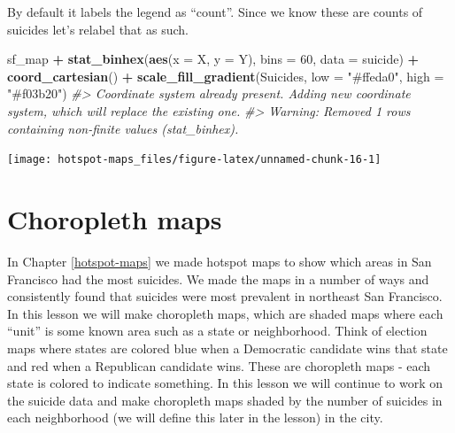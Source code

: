 \documentclass[
  12pt,
]{book}
\newenvironment{Shaded}{\begin{snugshade}}{\end{snugshade}}
\newcommand{\CommentTok}[1]{\textcolor[rgb]{0.56,0.35,0.01}{\textit{#1}}}
\newcommand{\DataTypeTok}[1]{\textcolor[rgb]{0.13,0.29,0.53}{#1}}
\newcommand{\DecValTok}[1]{\textcolor[rgb]{0.00,0.00,0.81}{#1}}
\newcommand{\KeywordTok}[1]{\textcolor[rgb]{0.13,0.29,0.53}{\textbf{#1}}}
\newcommand{\NormalTok}[1]{#1}
\newcommand{\OperatorTok}[1]{\textcolor[rgb]{0.81,0.36,0.00}{\textbf{#1}}}
\newcommand{\StringTok}[1]{\textcolor[rgb]{0.31,0.60,0.02}{#1}}
\begin{document}
By default it labels the legend as ``count''. Since we know these are counts of suicides let's relabel that as such.

\begin{Shaded}
\begin{Highlighting}[]
\NormalTok{sf\_map }\OperatorTok{+}
\StringTok{  }\KeywordTok{stat\_binhex}\NormalTok{(}\KeywordTok{aes}\NormalTok{(}\DataTypeTok{x =}\NormalTok{ X, }\DataTypeTok{y =}\NormalTok{ Y),}
              \DataTypeTok{bins  =} \DecValTok{60}\NormalTok{,}
              \DataTypeTok{data =}\NormalTok{ suicide) }\OperatorTok{+}
\StringTok{  }\KeywordTok{coord\_cartesian}\NormalTok{() }\OperatorTok{+}
\StringTok{  }\KeywordTok{scale\_fill\_gradient}\NormalTok{(}\StringTok{\textquotesingle{}Suicides\textquotesingle{}}\NormalTok{,}
                      \DataTypeTok{low =} \StringTok{"\#ffeda0"}\NormalTok{,}
                      \DataTypeTok{high =} \StringTok{"\#f03b20"}\NormalTok{)}
\CommentTok{\#> Coordinate system already present. Adding new coordinate system, which will replace the existing one.}
\CommentTok{\#> Warning: Removed 1 rows containing non{-}finite values (stat\_binhex).}
\end{Highlighting}
\end{Shaded}

\begin{center}\texttt{[image: hotspot-maps\_files/figure-latex/unnamed-chunk-16-1]} \end{center}

\hypertarget{choropleth-maps}{%
\chapter{Choropleth maps}\label{choropleth-maps}}

In Chapter \ref{hotspot-maps} we made hotspot maps to show which areas in San Francisco had the most suicides. We made the maps in a number of ways and consistently found that suicides were most prevalent in northeast San Francisco. In this lesson we will make choropleth maps, which are shaded maps where each ``unit'' is some known area such as a state or neighborhood. Think of election maps where states are colored blue when a Democratic candidate wins that state and red when a Republican candidate wins. These are choropleth maps - each state is colored to indicate something. In this lesson we will continue to work on the suicide data and make choropleth maps shaded by the number of suicides in each neighborhood (we will define this later in the lesson) in the city.
\end{document}
